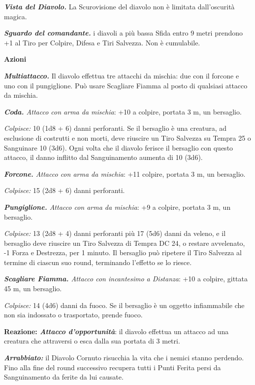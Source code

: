 \begin{multicols}{2}
{\emph{\textbf{Vista del Diavolo.}} La Scurovisione del diavolo non è limitata dall'oscurità magica.

\emph{\textbf{Sguardo del comandante.}} i diavoli a più bassa Sfida entro 9 metri prendono +1 al Tiro per Colpire, Difesa e Tiri Salvezza. Non è cumulabile.

\textbf{Azioni}

\emph{\textbf{Multiattacco.}} Il diavolo effettua tre attacchi da mischia: due con il forcone e uno con il pungiglione. Può usare Scagliare Fiamma al posto di qualsiasi attacco da mischia.

\emph{\textbf{Coda.} Attacco con arma da mischia}: +10 a colpire, portata 3 m, un bersaglio.

\emph{Colpisce:} 10 (1d8 + 6) danni perforanti. Se il bersaglio è una creatura, ad esclusione di costrutti e non morti, deve riuscire un Tiro Salvezza su Tempra 25 o Sanguinare 10 (3d6). Ogni volta che il diavolo ferisce il bersaglio con questo attacco, il danno inflitto dal Sanguinamento aumenta di 10 (3d6).

\emph{\textbf{Forcone.} Attacco con arma da mischia}: +11 colpire, portata 3 m, un bersaglio.

\emph{Colpisce:} 15 (2d8 + 6) danni perforanti.

\emph{\textbf{Pungiglione.} Attacco con arma da mischia}: +9 a colpire, portata 3 m, un bersaglio.

\emph{Colpisce:} 13 (2d8 + 4) danni perforanti più 17 (5d6) danni da veleno, e il bersaglio deve riuscire un Tiro Salvezza di Tempra DC 24, o restare avvelenato, -1 Forza e Destrezza, per 1 minuto. Il bersaglio può ripetere il Tiro Salvezza al termine di ciascun suo round, terminando l'effetto se lo riesce.

\emph{\textbf{Scagliare Fiamma.} Attacco con incantesimo a Distanza}: +10 a colpire, gittata 45 m, un bersaglio.

\emph{Colpisce:} 14 (4d6) danni da fuoco. Se il bersaglio è un oggetto infiammabile che non sia indossato o trasportato, prende fuoco.

\textbf{Reazione: \emph{Attacco d'opportunità}}: il diavolo effettua un attacco ad una creatura che attraversi o esca dalla sua portata di 3 metri.

\emph{\textbf{Arrabbiato:}} il Diavolo Cornuto risucchia la vita che i nemici stanno perdendo. Fino alla fine del round successivo recupera tutti i Punti Ferita persi da Sanguinamento da ferite da lui causate.

}
\end{multicols}
